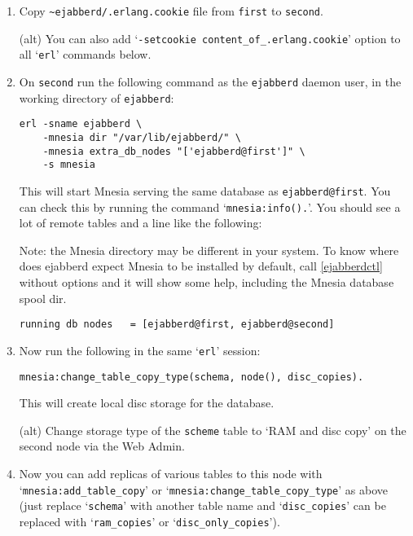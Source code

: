 \documentclass[a4paper,10pt]{book}
\newcommand{\node}[1]{\texttt{#1}}
\newcommand{\term}[1]{\texttt{#1}}
\newcommand{\shell}[1]{\texttt{#1}}
\newcommand{\ejabberd}{\texttt{ejabberd}}
\begin{document}
\begin{enumerate}
\item Copy \verb|~ejabberd/.erlang.cookie| file from \term{first} to
  \term{second}.

  (alt) You can also add `\verb|-setcookie content_of_.erlang.cookie|'
  option to all `\shell{erl}' commands below.

\item On \term{second} run the following command as the \ejabberd{} daemon user,
  in the working directory of \ejabberd{}:

\begin{verbatim}
erl -sname ejabberd \
    -mnesia dir "/var/lib/ejabberd/" \
    -mnesia extra_db_nodes "['ejabberd@first']" \
    -s mnesia
\end{verbatim}

  This will start Mnesia serving the same database as \node{ejabberd@first}.
  You can check this by running the command `\verb|mnesia:info().|'. You
  should see a lot of remote tables and a line like the following:

  Note: the Mnesia directory may be different in your system.
  To know where does ejabberd expect Mnesia to be installed by default,
  call \ref{ejabberdctl} without options and it will show some help,
  including the Mnesia database spool dir.

\begin{verbatim}
running db nodes   = [ejabberd@first, ejabberd@second]
\end{verbatim}


\item Now run the following in the same `\shell{erl}' session:

\begin{verbatim}
mnesia:change_table_copy_type(schema, node(), disc_copies).
\end{verbatim}

  This will create local disc storage for the database.

  (alt) Change storage type of the \term{scheme} table to `RAM and disc
  copy' on the second node via the Web Admin.


\item Now you can add replicas of various tables to this node with
  `\verb|mnesia:add_table_copy|' or
  `\verb|mnesia:change_table_copy_type|' as above (just replace
  `\verb|schema|' with another table name and `\verb|disc_copies|'
  can be replaced with `\verb|ram_copies|' or
  `\verb|disc_only_copies|').


\end{enumerate}
\end{document}
